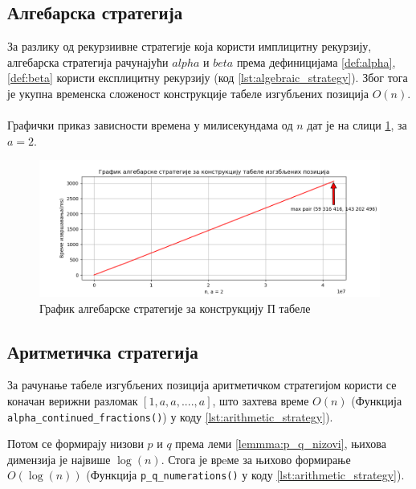 \documentclass[a4paper]{article}
\begin{document}
\subsection{Алгебарска стратегија}

За разлику од рекурзиивне стратегије која користи имплицитну рекурзију, алгебарска стратегија рачунајући $ alpha $ и $ beta $ према дефиницијама \eqref{def:alpha}, \eqref{def:beta} користи експлицитну рекурзију (код \ref{lst:algebraic_strategy}). Због тога је укупна временска сложеност конструкције табеле изгубљених позиција $ O(n) $.\\



\leavevmode\\
Графички приказ зависности времена у милисекундама од $ n $ дат је на слици \ref{fig:algebraic}, за $ a = 2 $.

\begin{figure}[H]
	\begin{center}
		\includegraphics[width=\textwidth]{algebraic.png}
	\end{center}
	\caption{График алгебарске стратегије за конструкцију П табеле}
	\label{fig:algebraic}
\end{figure}

\subsection{Аритметичка стратегија}

За рачунање табеле изгубљених позиција аритметичком стратегијом користи се коначан верижни разломак $ [1, a, a, ...., a] $, што захтева време $ O(n) $ (Функција \verb|alpha_continued_fractions()|) у коду \ref{lst:arithmetic_strategy}).

Потом се формирају низови $ p $ и $ q $ према леми \ref{lemmma:p_q_nizovi}, њихова димензија је највише $ \log(n) $. Стога је врeме за њихово формирање $ O(\log(n)) $ (Функција \verb|p_q_numerations()| у коду \ref{lst:arithmetic_strategy}).
\end{document}

